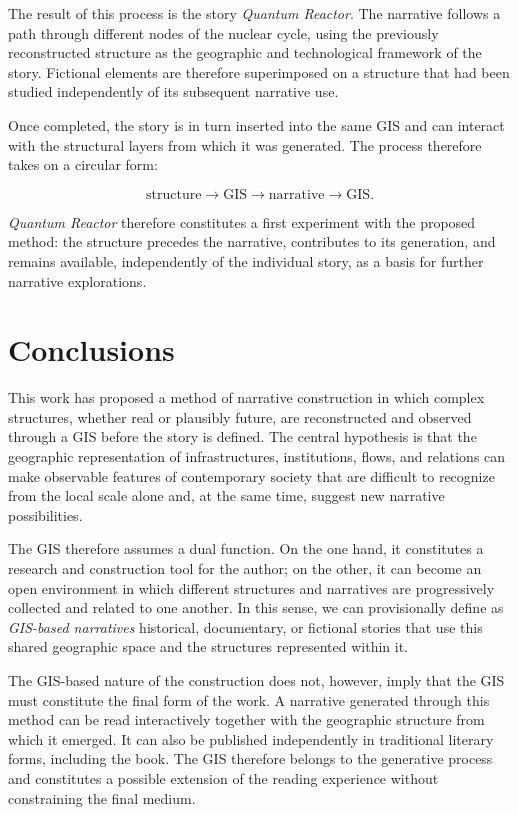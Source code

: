 \documentclass[11pt,a4paper]{article}
\begin{document}
The result of this process is the story \emph{Quantum Reactor}. The narrative follows a path through different nodes of the nuclear cycle, using the previously reconstructed structure as the geographic and technological framework of the story. Fictional elements are therefore superimposed on a structure that had been studied independently of its subsequent narrative use.

Once completed, the story is in turn inserted into the same GIS and can interact with the structural layers from which it was generated. The process therefore takes on a circular form:

\[
\mathrm{structure}
\rightarrow
\mathrm{GIS}
\rightarrow
\mathrm{narrative}
\rightarrow
\mathrm{GIS}.
\]

\emph{Quantum Reactor} therefore constitutes a first experiment with the proposed method: the structure precedes the narrative, contributes to its generation, and remains available, independently of the individual story, as a basis for further narrative explorations.





\section{Conclusions}

This work has proposed a method of narrative construction in which complex structures, whether real or plausibly future, are reconstructed and observed through a GIS before the story is defined. The central hypothesis is that the geographic representation of infrastructures, institutions, flows, and relations can make observable features of contemporary society that are difficult to recognize from the local scale alone and, at the same time, suggest new narrative possibilities.

The GIS therefore assumes a dual function. On the one hand, it constitutes a research and construction tool for the author; on the other, it can become an open environment in which different structures and narratives are progressively collected and related to one another. In this sense, we can provisionally define as \emph{GIS-based narratives} historical, documentary, or fictional stories that use this shared geographic space and the structures represented within it.

The GIS-based nature of the construction does not, however, imply that the GIS must constitute the final form of the work. A narrative generated through this method can be read interactively together with the geographic structure from which it emerged. It can also be published independently in traditional literary forms, including the book. The GIS therefore belongs to the generative process and constitutes a possible extension of the reading experience without constraining the final medium.
\end{document}
